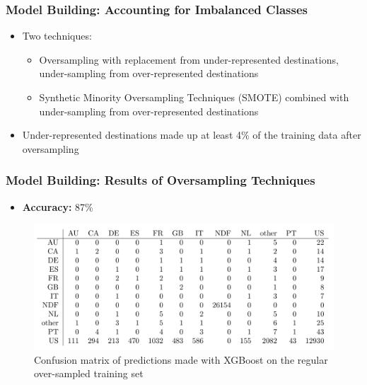 \documentclass{beamer}
\begin{document}

\begin{frame}
\frametitle{Model Building: Accounting for Imbalanced Classes}
\begin{itemize}
  \item Two techniques:
  \begin{itemize}
    \item Oversampling with replacement from under-represented destinations, under-sampling from over-represented destinations
    \item Synthetic Minority Oversampling Techniques (SMOTE) combined with under-sampling from over-represented destinations 
  \end{itemize}
  \item Under-represented destinations made up at least 4\% of the training data after oversampling
\end{itemize}
\end{frame}


\begin{frame}
\frametitle{Model Building: Results of Oversampling Techniques}
\begin{itemize}
  \item \textbf{Accuracy:} 87\%
\end{itemize}
\begin{figure}
\includegraphics[width=1\linewidth]{confusion_matrix.png}
\caption{Confusion matrix of predictions made with XGBoost on the regular over-sampled training set}
\end{figure}
\end{frame}

\end{document}
